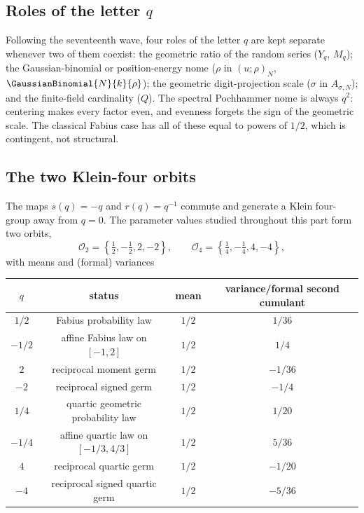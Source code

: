 \documentclass[11pt,oneside]{article}
\numberwithin{equation}{section}
\theoremstyle{definition}
\theoremstyle{remark}
\begin{document}
\subsection{Roles of the letter \texorpdfstring{$q$}{q}}

Following the seventeenth wave, four roles of the letter $q$ are kept separate
whenever two of them coexist: the geometric ratio of the random series
($Y_q$, $M_q$); the Gaussian-binomial or position-energy nome ($\rho$ in
$(u;\rho)_N$, $\GaussianBinomial{N}{k}{\rho}$); the geometric digit-projection scale
($\sigma$ in $A_{\sigma,N}$); and the finite-field cardinality ($Q$).  The
spectral Pochhammer nome is always $q^2$: centering makes every factor even,
and evenness forgets the sign of the geometric scale.  The classical Fabius
case has all of these equal to powers of $1/2$, which is contingent, not
structural.

\subsection{The two Klein-four orbits}

The maps $s(q)=-q$ and $r(q)=q^{-1}$ commute and generate a Klein four-group
away from $q=0$.  The parameter values studied throughout this part form two
orbits,
\[
 \mathcal O_2=\left\{\tfrac12,-\tfrac12,2,-2\right\},
 \qquad
 \mathcal O_4=\left\{\tfrac14,-\tfrac14,4,-4\right\},
\]
with means and (formal) variances
\begin{center}
\begin{tabular}{c c c c}
\toprule
$q$ & status & mean & variance/formal second cumulant \\
\midrule
$1/2$ & Fabius probability law & $1/2$ & $1/36$ \\
$-1/2$ & affine Fabius law on $[-1,2]$ & $1/2$ & $1/4$ \\
$2$ & reciprocal moment germ & $1/2$ & $-1/36$ \\
$-2$ & reciprocal signed germ & $1/2$ & $-1/4$ \\
\addlinespace
$1/4$ & quartic geometric probability law & $1/2$ & $1/20$ \\
$-1/4$ & affine quartic law on $[-1/3,4/3]$ & $1/2$ & $5/36$ \\
$4$ & reciprocal quartic germ & $1/2$ & $-1/20$ \\
$-4$ & reciprocal signed quartic germ & $1/2$ & $-5/36$ \\
\bottomrule
\end{tabular}
\end{center}
\end{document}
